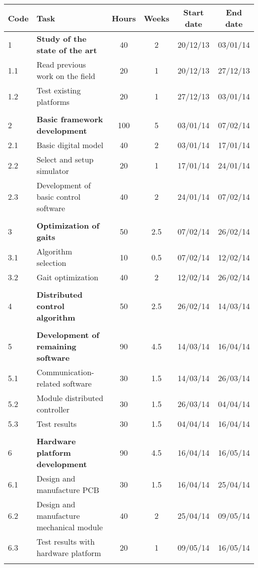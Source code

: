\begin{longtable}{|l|p{7cm}|c|c|c|c|}
    \hline
    Code & Task  & Hours & Weeks & Start date & End date  \\ \hline \hline 
    
    1 & \textbf{Study of the state of the art} & 40 & 2 & 20/12/13 & 03/01/14 \\ \hline
    1.1 & Read previous work on the field & 20 & 1 & 20/12/13 & 27/12/13 \\ \hline
    1.2 & Test existing platforms & 20 & 1 & 27/12/13 & 03/01/14 \\ \hline 
    \\ \hline
    
    2 & \textbf{Basic framework development} & 100 & 5 & 03/01/14 & 07/02/14 \\ \hline
    2.1 & Basic digital model & 40 & 2 & 03/01/14 & 17/01/14 \\ \hline
    2.2 & Select and setup simulator & 20 & 1 & 17/01/14 & 24/01/14 \\ \hline
    2.3 & Development of basic control software & 40 & 2 & 24/01/14 & 07/02/14 \\ \hline      
    \\ \hline
    
    3 & \textbf{Optimization of gaits} & 50 & 2.5 & 07/02/14 & 26/02/14 \\ \hline
    3.1 & Algorithm selection & 10 & 0.5 & 07/02/14 & 12/02/14 \\ \hline 
    3.2 & Gait optimization & 40 & 2 & 12/02/14 & 26/02/14 \\ \hline  \\ \hline
  
    4 & \textbf{Distributed control algorithm} & 50 & 2.5 & 26/02/14 & 14/03/14 \\ \hline
    \\ \hline
    
    5 & \textbf{Development of remaining software} & 90 & 4.5 & 14/03/14 & 16/04/14 \\ \hline
    5.1 & Communication-related software & 30 & 1.5 & 14/03/14 & 26/03/14 \\ \hline 
    5.2 & Module distributed controller & 30 & 1.5 & 26/03/14 & 04/04/14 \\ \hline 
    5.3 & Test results & 30 & 1.5 & 04/04/14 & 16/04/14 \\ \hline 
    \\ \hline    

    6 & \textbf{Hardware platform development} & 90 & 4.5 & 16/04/14 & 16/05/14 \\ \hline
    6.1 & Design and manufacture PCB & 30 & 1.5 & 16/04/14 & 25/04/14 \\ \hline 
    6.2 & Design and manufacture mechanical module & 40 & 2 & 25/04/14 & 09/05/14 \\ \hline 
    6.3 & Test results with hardware platform & 20 & 1 & 09/05/14 & 16/05/14 \\ \hline 
    \\ \hline   
        

\end{longtable}
